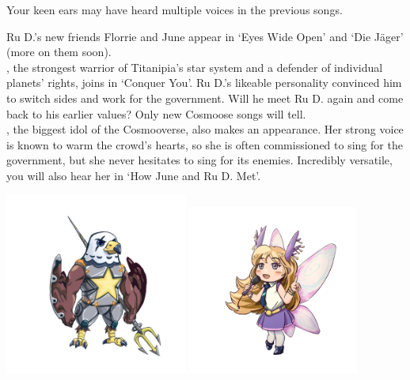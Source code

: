 
Your keen ears may have heard multiple voices in the previous songs.

Ru D.'s new friends Florrie and June appear in `Eyes Wide Open' and `Die Jäger' (more on them soon).\\

, the strongest warrior of Titanipia's star system and a defender of individual planets' rights, joins in `Conquer You'. Ru D.'s likeable personality convinced him to switch sides and work for the government. Will he meet Ru D. again and come back to his earlier values? Only new Cosmoose songs will tell.\\

, the biggest idol of the Cosmooverse, also makes an appearance. Her strong voice is known to warm the crowd's hearts, so she is often commissioned to sing for the government, but she never hesitates to sing for its enemies. Incredibly versatile, you will also hear her in `How June and Ru D. Met'.\\

\begin{center}
\includegraphics[width=0.45\textwidth]{Assets/starsmash}
\includegraphics[width=0.42\textwidth]{Assets/camo}
\end{center}

